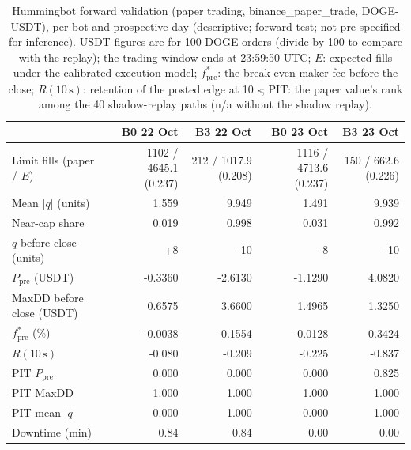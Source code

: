 \begin{table}[htbp]
\centering
\small
\caption{Hummingbot forward validation (paper trading, binance\_paper\_trade, DOGE-USDT), per bot and prospective day (descriptive; forward test; not pre-specified for inference). USDT figures are for 100-DOGE orders (divide by 100 to compare with the replay); the trading window ends at 23:59:50 UTC; $E$: expected fills under the calibrated execution model; $f^{*}_{\mathrm{pre}}$: the break-even maker fee before the close; $R(10\,\mathrm{s})$: retention of the posted edge at 10 s; PIT: the paper value's rank among the 40 shadow-replay paths (n/a without the shadow replay).}
\label{tab:hb-forward-validation}
\begin{tabular}{lrrrr}
\toprule
 & B0 22 Oct & B3 22 Oct & B0 23 Oct & B3 23 Oct \\
\midrule
Limit fills (paper / $E$) & 1102 / 4645.1 (0.237) & 212 / 1017.9 (0.208) & 1116 / 4713.6 (0.237) & 150 / 662.6 (0.226) \\
Mean $|q|$ (units) & 1.559 & 9.949 & 1.491 & 9.939 \\
Near-cap share & 0.019 & 0.998 & 0.031 & 0.992 \\
$q$ before close (units) & +8 & -10 & -8 & -10 \\
$P_{\mathrm{pre}}$ (USDT) & -0.3360 & -2.6130 & -1.1290 & 4.0820 \\
MaxDD before close (USDT) & 0.6575 & 3.6600 & 1.4965 & 1.3250 \\
$f^{*}_{\mathrm{pre}}$ (\%) & -0.0038 & -0.1554 & -0.0128 & 0.3424 \\
$R(10\,\mathrm{s})$ & -0.080 & -0.209 & -0.225 & -0.837 \\
PIT $P_{\mathrm{pre}}$ & 0.000 & 0.000 & 0.000 & 0.825 \\
PIT MaxDD & 1.000 & 1.000 & 1.000 & 1.000 \\
PIT mean $|q|$ & 0.000 & 1.000 & 0.000 & 1.000 \\
Downtime (min) & 0.84 & 0.84 & 0.00 & 0.00 \\
\bottomrule
\end{tabular}
\end{table}
